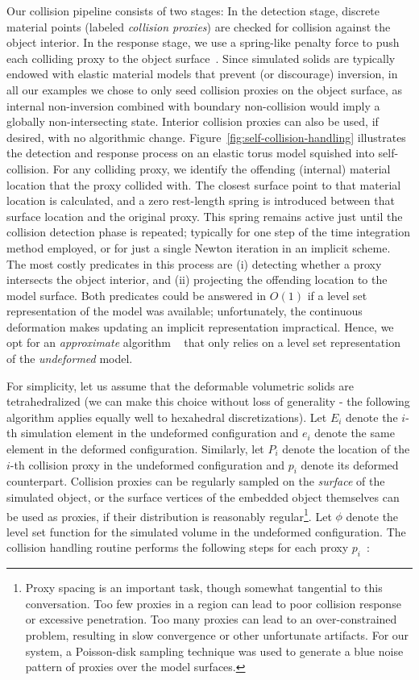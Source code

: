 Our collision pipeline consists of two stages: In the detection stage,
discrete material points (labeled \emph{collision proxies}) are
checked for collision against the object interior. In the response
stage, we use a spring-like penalty force to push each colliding proxy
to the object surface~\citep{TeranSIF:2005,McAdaZSETTS:2011}. Since
simulated solids are typically endowed with elastic material models
that prevent (or discourage) inversion, in all our examples we chose
to only seed collision proxies on the object surface, as internal
non-inversion combined with boundary non-collision would imply a
globally non-intersecting state. Interior collision proxies can also
be used, if desired, with no algorithmic
change. Figure~\ref{fig:self-collision-handling} illustrates the
detection and response process on an elastic torus model squished into
self-collision. For any colliding proxy, we identify the offending
(internal) material location that the proxy collided with. The closest
surface point to that material location is calculated, and a zero
rest-length spring is introduced between that surface location and the
original proxy. This spring remains active just until the collision
detection phase is repeated; typically for one step of the time
integration method employed, or for just a single Newton iteration in
an implicit scheme. The most costly predicates in this process are (i)
detecting whether a proxy intersects the object interior, and (ii)
projecting the offending location to the model surface. Both
predicates could be answered in $O(1)$ if a level set representation
of the model was available; unfortunately, the continuous deformation
makes updating an implicit representation impractical. Hence, we opt
for an \emph{approximate} algorithm ~\citep{McAdaZSETTS:2011} that only
relies on a level set representation of the \emph{undeformed} model.

For simplicity, let us assume that the deformable volumetric solids
are tetrahedralized (we can make this choice without loss of
generality - the following algorithm applies equally well to
hexahedral discretizations). Let $E_i$ denote the $i$-th simulation
element in the undeformed configuration and $e_i$ denote the same
element in the deformed configuration. Similarly, let $P_i$ denote the
location of the $i$-th collision proxy in the undeformed configuration
and $p_i$ denote its deformed counterpart.  Collision proxies can be
regularly sampled on the \emph{surface} of the simulated object, or
the surface vertices of the embedded object themselves can be used as
proxies, if their distribution is reasonably regular\footnote{Proxy
  spacing is an important task, though somewhat tangential to
  this conversation. Too few proxies in a region can lead to poor
  collision response or excessive penetration. Too many proxies can
  lead to an over-constrained problem, resulting in slow convergence or
  other unfortunate artifacts. For our system, a Poisson-disk
  sampling technique \citep{CorsiCS:2012,Devro:1986} was used to generate a blue noise pattern
of proxies over the model surfaces.}.  Let $\phi$
denote the level set function for the simulated volume in the
undeformed configuration. The collision handling routine performs the
following steps for each proxy $p_i$\ :

